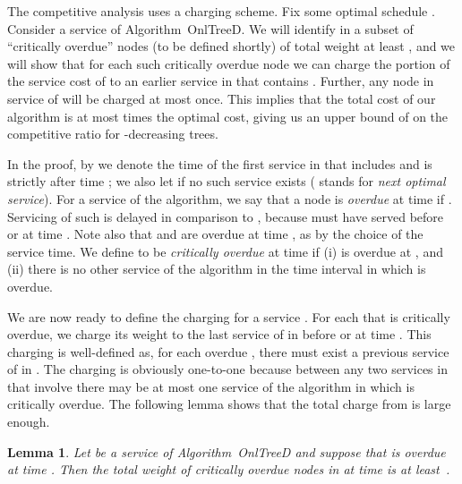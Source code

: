\documentclass[a4paper]{article}
\newtheorem{lemma}[theorem]{Lemma}
\newcommand{\OnAlgTreesDeadlines}{{\sc OnlTreeD}}
\begin{document}
The competitive analysis uses a charging scheme. Fix some optimal
schedule . Consider a service  of
Algorithm~{\OnAlgTreesDeadlines}.  We will identify in  a subset of
``critically overdue'' nodes (to be defined shortly) of total weight
at least , and we will show that for each
such critically overdue node  we can charge the portion 
of the service cost of  to an earlier service in  that
contains .  Further, any node in service of  will be
charged at most once.  This implies that the total cost of our
algorithm is at most  times the optimal cost, giving us an upper
bound of  on the competitive ratio for -decreasing trees.

In the proof, by  we denote the time of the first
service in 
that includes  and is strictly after time ; we
also let  if no such service exists  
( stands for \emph{next optimal service}).
For a service  of the algorithm, we say that a node  is
\emph{overdue} at time  if . Servicing of
such  is delayed in comparison to , because
 must have served  before or at time .  Note
also that  and  are overdue at time , as  by
the choice of the service time.  We define  to be \emph{critically
  overdue} at time  if (i)  is overdue at , and (ii)
there is no other service of the algorithm in the time interval
 in which  is overdue.

We are now ready to define the charging for a service .  For
each  that is critically overdue, we charge its weight
 to the last service of  in  before or at
time .  This charging is well-defined as, for each overdue ,
there must exist a previous service of  in . The
charging is obviously one-to-one because between any two services in
 that involve  there may be at most one service of the
algorithm in which  is critically overdue.  The following lemma
shows that the total charge from  is large enough.


\begin{lemma}\label{l:d:charge}
Let  be a service of Algorithm~{\OnAlgTreesDeadlines} and
suppose that  is overdue at time . 
Then the total weight of critically overdue nodes in  at time 
is at least~.
\end{lemma}
\end{document}
